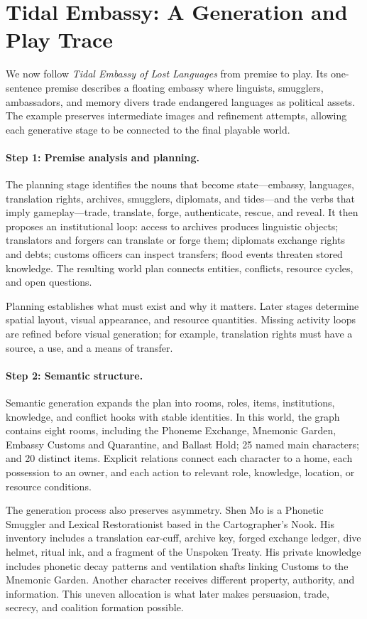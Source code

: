 \section{Tidal Embassy: A Generation and Play Trace}
\label{app:tidal}


We now follow \emph{Tidal Embassy of Lost Languages} from premise to play. Its
one-sentence premise describes a
floating embassy where linguists, smugglers, ambassadors, and memory divers
trade endangered languages as political assets. The example preserves
intermediate images and refinement attempts, allowing each generative stage to
be connected to the final playable world.

\paragraph{Step 1: Premise analysis and planning.}
The planning stage identifies the nouns that become state---embassy,
languages, translation rights, archives, smugglers, diplomats, and tides---and
the verbs that imply gameplay---trade, translate, forge, authenticate, rescue,
and reveal. It then proposes an institutional loop: access to archives produces
linguistic objects; translators and forgers can
translate or forge them; diplomats exchange rights and debts; customs officers
can inspect transfers; flood events threaten stored knowledge. The resulting
world plan connects entities, conflicts, resource cycles, and open questions.

Planning establishes what must exist and why it matters. Later stages determine
spatial layout, visual appearance, and resource quantities. Missing activity
loops are refined before visual generation; for example, translation rights
must have a source, a use, and a means of transfer.

\paragraph{Step 2: Semantic structure.}
Semantic generation expands the plan into rooms, roles, items, institutions,
knowledge, and conflict hooks with stable identities. In this world,
the graph contains eight rooms, including the Phoneme Exchange, Mnemonic
Garden, Embassy Customs and Quarantine, and Ballast Hold; 25 named main
characters; and 20 distinct items. Explicit relations connect each character to
a home, each possession to an owner, and each action to relevant role,
knowledge, location, or resource conditions.

The generation process also preserves asymmetry. Shen Mo is a Phonetic
Smuggler and Lexical Restorationist based in the Cartographer's Nook. His
inventory includes a translation ear-cuff, archive key, forged exchange ledger,
dive helmet, ritual ink, and a fragment of the Unspoken Treaty. His private
knowledge includes phonetic decay patterns and ventilation shafts linking
Customs to the Mnemonic Garden. Another character receives different property,
authority, and information. This uneven allocation is what later makes
persuasion, trade, secrecy, and coalition formation possible.

